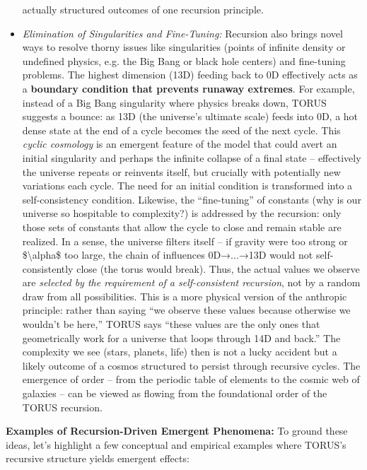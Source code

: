 \documentclass[
]{article}
\begin{document}
\begin{itemize}
  actually structured outcomes of one recursion principle.
\item
  \emph{Elimination of Singularities and Fine-Tuning:} Recursion also
  brings novel ways to resolve thorny issues like singularities (points
  of infinite density or undefined physics, e.g. the Big Bang or black
  hole centers) and fine-tuning problems. The highest dimension (13D)
  feeding back to 0D effectively acts as a \textbf{boundary condition
  that prevents runaway extremes}. For example, instead of a Big Bang
  singularity where physics breaks down, TORUS suggests a bounce: as 13D
  (the universe's ultimate scale) feeds into 0D, a hot dense state at
  the end of a cycle becomes the seed of the next cycle\hspace{0pt}.
  This \emph{cyclic cosmology} is an emergent feature of the model that
  could avert an initial singularity and perhaps the infinite collapse
  of a final state -- effectively the universe repeats or reinvents
  itself, but crucially with potentially new variations each cycle. The
  need for an initial condition is transformed into a self-consistency
  condition. Likewise, the ``fine-tuning'' of constants (why is our
  universe so hospitable to complexity?) is addressed by the recursion:
  only those sets of constants that allow the cycle to close and remain
  stable are realized\hspace{0pt}. In a sense, the universe filters
  itself -- if gravity were too strong or \$\textbackslash alpha\$ too
  large, the chain of influences 0D→...→13D would not self-consistently
  close (the torus would break). Thus, the actual values we observe are
  \emph{selected by the requirement of a self-consistent recursion}, not
  by a random draw from all possibilities\hspace{0pt}. This is a more
  physical version of the anthropic principle: rather than saying ``we
  observe these values because otherwise we wouldn't be here,'' TORUS
  says ``these values are the only ones that geometrically work for a
  universe that loops through 14D and back.'' The complexity we see
  (stars, planets, life) then is not a lucky accident but a likely
  outcome of a cosmos structured to persist through recursive cycles.
  The emergence of order -- from the periodic table of elements to the
  cosmic web of galaxies -- can be viewed as flowing from the
  foundational order of the TORUS recursion.
\end{itemize}

\textbf{Examples of Recursion-Driven Emergent Phenomena:} To ground
these ideas, let's highlight a few conceptual and empirical examples
where TORUS's recursive structure yields emergent effects:
\end{document}
